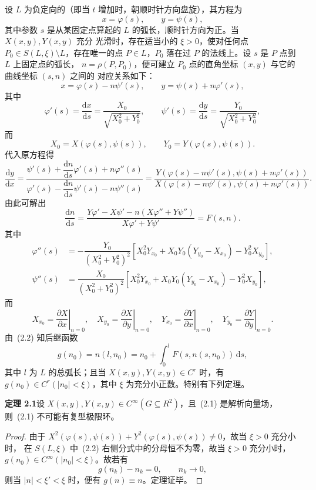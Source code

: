 设 $L$ 为负定向的（即当 $t$ 增加时，朝顺时针方向盘旋），其方程为
\[
  x=\varphi(s),\qquad y=\psi(s),
\]
其中参数 $s$ 是从某固定点算起的 $L$ 的弧长，顺时针方向为正。当 $X(x,y),Y(x,y)$ 充分
光滑时，存在适当小的 $\xi>0$，使对任何点 $P_0\in S(L,\xi)\setminus L$，存在唯一的点
$P\in L$，$P_0$ 落在过 $P$ 的法线上。设 $s$ 是 $P$ 点到 $L$ 上固定点的弧长，
$n=\rho(P,P_0)$，便可建立 $P_0$ 点的直角坐标 $(x,y)$ 与它的曲线坐标 $(s,n)$ 之间的
对应关系如下：
\[
  x=\varphi(s)-n\psi'(s),\qquad
  y=\psi(s)+n\varphi'(s),
\]
其中
\[
  \varphi'(s)=\dfrac{\mathrm{d}x}{\mathrm{d}s}
  =\dfrac{X_0}{\sqrt{X_0^2+Y_0^2}},\qquad
  \psi'(s)=\dfrac{\mathrm{d}y}{\mathrm{d}s}
  =\dfrac{Y_0}{\sqrt{X_0^2+Y_0^2}},
\]
而
\[
  X_0=X(\varphi(s),\psi(s)),\qquad Y_0=Y(\varphi(s),\psi(s)).
\]
代入原方程得
\[
  \dfrac{\mathrm{d}y}{\mathrm{d}x}
  =\dfrac{\psi'(s)+\dfrac{\mathrm{d}n}{\mathrm{d}s}\varphi'(s)+n\varphi''(s)}
  {\varphi'(s)-\dfrac{\mathrm{d}n}{\mathrm{d}s}\psi'(s)-n\psi''(s)}
  =\dfrac{Y(\varphi(s)-n\psi'(s),\psi(s)+n\varphi'(s))}
  {X(\varphi(s)-n\psi'(s),\psi(s)+n\varphi'(s))}.
\]
由此可解出
\[
  \dfrac{\mathrm{d}n}{\mathrm{d}s}
  =\dfrac{Y\varphi'-X\psi'-n(X\varphi''+Y\psi'')}{X\varphi'+Y\psi'}
  =F(s,n). \tag{2.2}
\]
其中
\[
\begin{aligned}
  \varphi''(s)&=-\dfrac{Y_0}{(X_0^2+Y_0^2)^2}
  [X_0^2Y_{x_0}+X_0Y_0(Y_{y_0}-X_{x_0})-Y_0^2X_{y_0}],\\
  \psi''(s)&=\dfrac{X_0}{(X_0^2+Y_0^2)^2}
  [X_0^2Y_{x_0}+X_0Y_0(Y_{y_0}-X_{x_0})-Y_0^2X_{y_0}],
\end{aligned}
\]
而
\[
  X_{x_0}=\left.\dfrac{\partial X}{\partial x}\right|_{n=0},\quad
  X_{y_0}=\left.\dfrac{\partial X}{\partial y}\right|_{n=0},\quad
  Y_{x_0}=\left.\dfrac{\partial Y}{\partial x}\right|_{n=0},\quad
  Y_{y_0}=\left.\dfrac{\partial Y}{\partial y}\right|_{n=0}.
\]
由~(2.2) 知后继函数
\[
  g(n_0)=n(l,n_0)=n_0+\int_0^lF(s,n(s,n_0))\,\mathrm{d}s, \tag{2.4}
\]
其中 $l$ 为 $L$ 的总弧长；且当 $X(x,y),Y(x,y)\in C^r$ 时，有
$g(n_0)\in C^r(|n_0|<\xi)$，其中 $\xi$ 为充分小正数。特别有下列定理。

\noindent\textbf{定理 2.1}\quad 设 $X(x,y),Y(x,y)\in C^\infty(G\subseteq R^2)$，且~(2.1)
是解析向量场，则~(2.1) 不可能有复型极限环。

\begin{proof}
由于 $X^2(\varphi(s),\psi(s))+Y^2(\varphi(s),\psi(s))\ne0$，故当 $\xi>0$ 充分小时，
在 $S(L,\xi)$ 中~(2.2) 右侧分式中的分母恒不为零，故当 $\xi>0$ 充分小时，
$g(n_0)\in C^\infty(|n_0|<\xi)$。故若有
\[
  g(n_k)-n_k=0,\qquad n_k\to0,
\]
则当 $|n|<\xi'<\xi$ 时，便有 $g(n)\equiv n$。定理证毕。
\end{proof}

